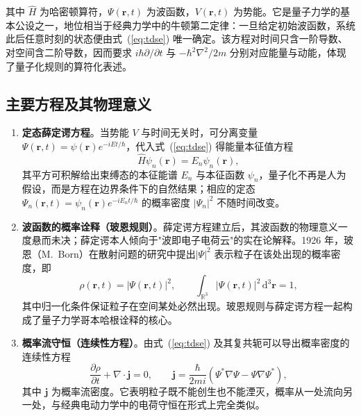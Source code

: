 \documentclass{ctexart} %
\begin{document}
其中 $\hat{H}$ 为哈密顿算符，$\Psi(\mathbf{r},t)$ 为波函数，$V(\mathbf{r},t)$ 为势能。它是量子力学的基本公设之一，地位相当于经典力学中的牛顿第二定律：一旦给定初始波函数，系统此后任意时刻的状态便由式~(\ref{eq:tdse}) 唯一确定。该方程对时间只含一阶导数、对空间含二阶导数，因而要求 $i\hbar\partial/\partial t$ 与 $-\hbar^2\nabla^2/2m$ 分别对应能量与动能，体现了量子化规则的算符化表述\cite{griffithsqm2018}。

\subsection*{主要方程及其物理意义}

\begin{enumerate}
    \item \textbf{定态薛定谔方程}。当势能 $V$ 与时间无关时，可分离变量 $\Psi(\mathbf{r},t) = \psi(\mathbf{r})e^{-iEt/\hbar}$，代入式~(\ref{eq:tdse}) 得能量本征值方程
    \begin{equation}
        \hat{H}\psi_n(\mathbf{r}) = E_n\psi_n(\mathbf{r}),
        \label{eq:tise}
    \end{equation}
    其平方可积解给出束缚态的本征能谱 $E_n$ 与本征函数 $\psi_n$，量子化不再是人为假设，而是方程在边界条件下的自然结果；相应的定态 $\Psi_n(\mathbf{r},t) = \psi_n(\mathbf{r})e^{-iE_nt/\hbar}$ 的概率密度 $|\Psi_n|^2$ 不随时间改变\cite{griffithsqm2018}。
    \item \textbf{波函数的概率诠释（玻恩规则）}。薛定谔方程建立后，其波函数的物理意义一度悬而未决；薛定谔本人倾向于"波即电子电荷云"的实在论解释。1926 年，玻恩（M.~Born）在散射问题的研究中提出$|\Psi|^2$ 表示粒子在该处出现的概率密度\cite{born1926}，即
    \begin{equation}
        \rho(\mathbf{r},t) = |\Psi(\mathbf{r},t)|^2,\qquad
        \int_{\mathbb{R}^3}|\Psi(\mathbf{r},t)|^2\,\mathrm{d}^3\mathbf{r} = 1,
        \label{eq:born}
    \end{equation}
    其中归一化条件保证粒子在空间某处必然出现。玻恩规则与薛定谔方程一起构成了量子力学哥本哈根诠释的核心。
    \item \textbf{概率流守恒（连续性方程）}。由式~(\ref{eq:tdse}) 及其复共轭可以导出概率密度的连续性方程
    \begin{equation}
        \frac{\partial\rho}{\partial t} + \nabla\cdot\mathbf{j} = 0,\qquad
        \mathbf{j} = \frac{\hbar}{2mi}\left(\Psi^*\nabla\Psi - \Psi\nabla\Psi^*\right),
        \label{eq:probflow}
    \end{equation}
    其中 $\mathbf{j}$ 为概率流密度。它表明粒子既不能创生也不能湮灭，概率从一处流向另一处，与经典电动力学中的电荷守恒在形式上完全类似\cite{griffithsqm2018}。

\end{enumerate}
\end{document}
